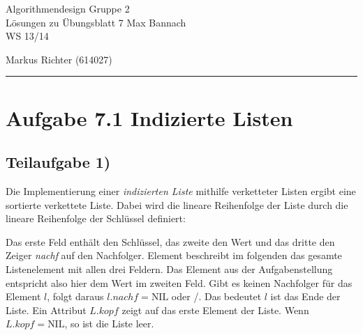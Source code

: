 \documentclass[a4paper, fontsize=10pt]{scrartcl}
\begin{document}
 

{\huge{Algorithmendesign} \hfill \large{ Gruppe 2}}\\  
{\large Lösungen zu Übungsblatt 7} \hfill Max Bannach\\
{\large WS 13/14}
\begin{flushright}Markus Richter (614027)\end{flushright}
\rule{\textwidth}{.3mm}

\section*{Aufgabe 7.1 Indizierte Listen}
\subsection*{Teilaufgabe 1)}
Die Implementierung einer \emph{indizierten Liste} mithilfe verketteter Listen ergibt eine sortierte verkettete Liste. Dabei wird die lineare Reihenfolge der Liste durch die lineare Reihenfolge der Schlüssel definiert: 
\begin{center}
\end{center}

Das erste Feld enthält den Schlüssel, das zweite den Wert und das dritte den Zeiger \emph{nachf} auf den Nachfolger. Element beschreibt im folgenden das gesamte Listenelement mit allen drei Feldern. Das Element aus der Aufgabenstellung entspricht also hier dem Wert im zweiten Feld. Gibt es keinen Nachfolger für das Element $l$, folgt daraus $l.nachf=\textrm{NIL}$ oder /. Das bedeutet $l$ ist das Ende der Liste. Ein Attribut $L.kopf$ zeigt auf das erste Element der Liste. Wenn $L.kopf=\textrm{NIL}$, so ist die Liste leer.
\bigskip
\end{document}

